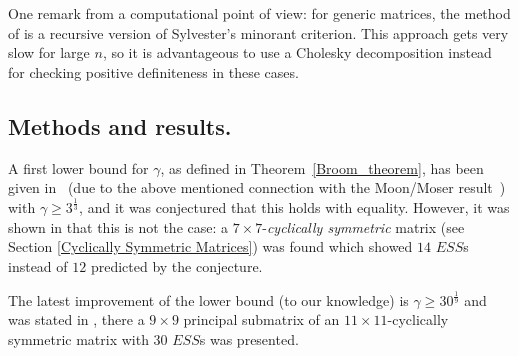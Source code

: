 \documentclass[moor]{informs3}              %
\begin{document}
One remark from a computational point of view: for generic matrices, the method of \cite[Thm.3.3]{Bomz92a} is a recursive version of Sylvester's minorant criterion. This approach gets very slow for large $n$, so it is advantageous to use a Cholesky decomposition instead for checking positive definiteness in these cases.


\subsection{Methods and results.}\label{secresu}

A first lower bound for $\gamma$, as defined in Theorem~\ref{Broom_theorem}, has been given in~\cite{Hofb88} (due to the above mentioned connection with the Moon/Moser result~\cite{Moon65}) with $\gamma \geq 3^\frac 1 3$, and it was conjectured that this holds with equality. However, it was shown in \cite{Vick88b} that this is not the case: a $7 \times 7$-\emph{cyclically symmetric} matrix (see Section \ref{Cyclically Symmetric Matrices}) was found which showed $14$ $ESS$s instead of $12$ predicted by the conjecture.

The latest improvement of the lower bound (to our knowledge) is $\gamma \geq 30^\frac 1 9$ and was stated in \cite{Broo93a}, there a $9\times 9$ principal submatrix of an $11\times 11$-cyclically symmetric matrix with $30$ $ESS$s was presented.
\end{document}

